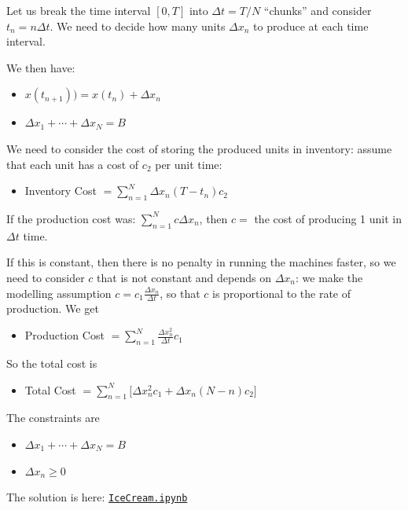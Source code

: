 \documentclass{workbook}
\begin{document}
\begin{solution}
\begin{slide}

\begin{parts}

\item Let us break the time interval $[0,T]$ into $\Delta t = T/N$ ``chunks'' and consider $t_n=n \Delta t$. We need to decide how many units $\Delta x_n$ to produce at each time interval.

\item We then have:
\begin{itemize}
	\item $x(t_{n+1})) = x(t_n) + \Delta x_n$
	\item $\Delta x_1 + \cdots + \Delta x_N = B$
\end{itemize}

\item We need to consider the cost of storing the produced units in inventory: assume that each unit has a cost of $c_2$ per unit time:
\begin{itemize}
	\item Inventory Cost $\displaystyle = \sum_{n=1}^N \Delta x_n (T-t_n) c_2$
\end{itemize}

\item If the production cost was: $\displaystyle\sum_{n=1}^N c \Delta x_n$, then $c=$ the cost of producing 1 unit in $\Delta t$ time.

If this is constant, then there is no penalty in running the machines faster, so we need to consider $c$ that is not constant and depends on $\Delta x_n$: we make the modelling assumption $c = c_1 \frac{\Delta x_n}{\Delta t}$, so that $c$ is proportional to the rate of production.
We get
\begin{itemize}
	\item Production Cost $\displaystyle = \sum_{n=1}^N  \frac{\Delta x_n^2}{\Delta t} c_1	$
\end{itemize}

\item So the total cost is
\begin{itemize}
	\item Total Cost $\displaystyle = \sum_{n=1}^N \bigg[ \Delta x_n^2 c_1 + \Delta x_n (N-n) c_2 \bigg]$
\end{itemize}

\item The constraints are
\begin{itemize}
	\item $\Delta x_1 + \cdots + \Delta x_N = B$
	\item $\Delta x_n \geq 0$
\end{itemize}

	
\item The solution is here: \href{https://utoronto.syzygy.ca/jupyter/user-redirect/git-pull?repo=https://github.com/bigfatbernie/IBLMathModeling&subPath=python/IceCream.ipynb}{\tt IceCream.ipynb}


\end{parts}

\end{slide}
\end{solution}
\end{document}

